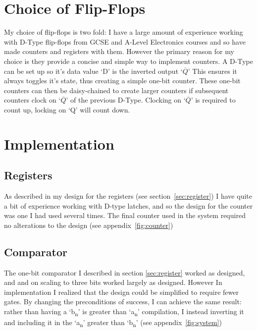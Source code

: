 \documentclass[11pt, article]{article}
\begin{document}
    \section{Choice of Flip-Flops}
        My choice of flip-flops is two fold: I have a large amount of experience working with D-Type flip-flops from GCSE and A-Level Electronics courses and so have made counters and registers with them. However the primary reason for my choice is they provide a concise and simple way to implement counters. A D-Type can be set up so it's data value `D' is the inverted output `$\overline{Q}$' This ensures it always toggles it's state, thus creating a simple one-bit counter. These one-bit counters can then be daisy-chained to create larger counters if subsequent counters clock on `$\overline{Q}$' of the previous D-Type. Clocking on `$\overline{Q}$' is required to count up, locking on `Q' will count down.

    \section{Implementation}        
        \subsection{Registers}
            As described in my design for the registers (see section~\ref{sec:register}) I have quite a bit of experience working with D-type latches, and so the design for the counter was one I had used several times. The final counter used in the system required no alterations to the design (see appendix~\ref{fig:counter})

        \subsection{Comparator}
            The one-bit comparator I described in section \ref{sec:register} worked as designed, and and on scaling to three bits worked largely as designed. However In implementation I realized that the design could be simplified to require fewer gates. By changing the preconditions of success, I can achieve the same result: rather than having a `b\textsubscript{n}' is greater than `a\textsubscript{n}' compilation, I instead inverting it and including it in the `a\textsubscript{n}' greater than `b\textsubscript{n}' (see appendix~\ref{fig:system})
\end{document}
